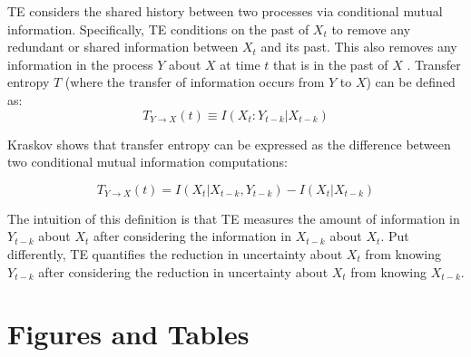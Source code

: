 TE considers the shared history between two processes via conditional mutual information. Specifically, TE conditions on the past of \(X_t\) to remove any redundant or shared information between \(X_t\) and its past. This also removes any information in the process \(Y\) about \(X\) at time \(t\) that is in the past of \(X\) \cite{b359}. Transfer entropy \(T\) (where the transfer of information occurs from \(Y\) to \(X\)) can be defined as:
\begin{equation}
T_{Y \rightarrow X} (t) \equiv I(X_t: Y_{t-k} |  X_{t-k})
\end{equation}

\noindent Kraskov \cite{kraskovEstimator} shows that transfer entropy can be expressed as the difference between two conditional mutual information computations: 

\begin{equation}  \label{eq:TE-MI-Diff}
T_{Y \rightarrow X}(t) = I(X_t | X_{t-k}, Y_{t-k}) -  I(X_t | X_{t-k}) 
 \end{equation} 

The intuition of this definition is that TE measures the amount of information in \(Y_{t-k}\) about \(X_t\) after  considering the information in \(X_{t-k}\) about \(X_t\). Put differently, TE quantifies the reduction in uncertainty about \(X_t\) from knowing \(Y_{t-k}\) after considering the reduction in uncertainty about \(X_t\) from knowing \(X_{t-k}\).



\section{Figures and Tables}


